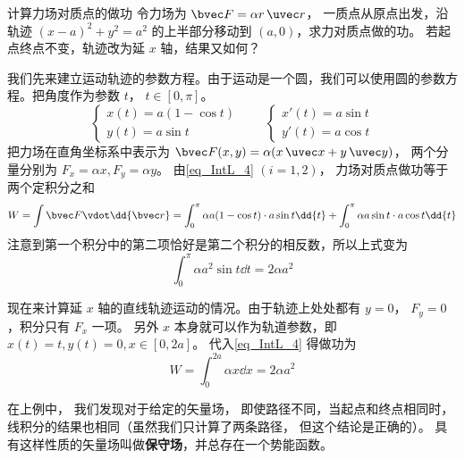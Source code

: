 \begin{example}{计算力场对质点的做功}\label{ex_IntL_1}
令力场为 $\bvec F = \alpha r \,\uvec r$， 一质点从原点出发，沿轨迹 $(x-a)^2 + y^2 = a^2$ 的上半部分移动到 $(a,0)$，求力对质点做的功。 若起点终点不变，轨迹改为延 $x$ 轴，结果又如何？

我们先来建立运动轨迹的参数方程。由于运动是一个圆，我们可以使用圆的参数方程。把角度作为参数 $t$， $t\in [0,\pi]$。
\begin{equation}
\begin{cases}
x(t) = a(1-\cos t)\\
y(t) = a \sin t
\end{cases}
\qquad 
\begin{cases}
x'(t) = a \sin t\\
y'(t) = a \cos t
\end{cases}
\end{equation}
把力场在直角坐标系中表示为 $\bvec F(x,y) = \alpha (x\,\uvec x + y\,\uvec y)$， 两个分量分别为 $F_x = \alpha x, F_y = \alpha y$。 由\autoref{eq_IntL_4} $(i=1,2)$， 力场对质点做功等于两个定积分之和
\begin{equation}
W = \int \bvec F \vdot \dd{\bvec r} =\int_0^\pi \alpha a(1-\cos t) \cdot a \sin t \dd{t} + \int_0^\pi \alpha a \sin t \cdot a \cos t \dd{t}
\end{equation}
注意到第一个积分中的第二项恰好是第二个积分的相反数，所以上式变为
\begin{equation}
\int_0^\pi \alpha a^2 \sin t \dd{t} =2 \alpha a^2
\end{equation}

现在来计算延 $x$ 轴的直线轨迹运动的情况。由于轨迹上处处都有 $y=0$， $F_y = 0$，积分只有 $F_x$ 一项。 另外 $x$ 本身就可以作为轨道参数，即 $x(t) = t, y(t) = 0, x\in [0, 2a]$。 代入\autoref{eq_IntL_4} 得做功为
\begin{equation}
W = \int_0^{2a} \alpha x \dd{x} = 2 \alpha a^2
\end{equation}
\end{example}

在上例中， 我们发现对于给定的矢量场， 即使路径不同，当起点和终点相同时， 线积分的结果也相同（虽然我们只计算了两条路径， 但这个结论是正确的）。 具有这样性质的矢量场叫做\textbf{保守场}，并总存在一个势能函数。 
